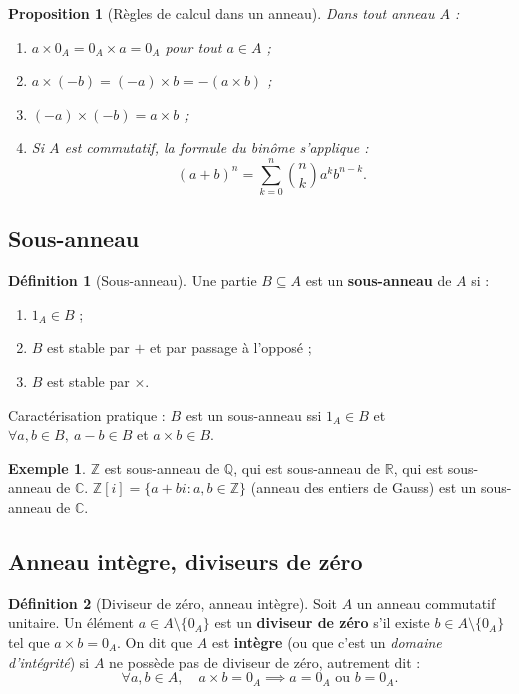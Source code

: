 \documentclass[12pt,a4paper]{report}
\newtheorem{proposition}[theoreme]{Proposition}
\theoremstyle{definition}
\newtheorem{definition}{Définition}[section]
\newtheorem{exemple}{Exemple}[section]
\theoremstyle{remark}
\begin{document}
\begin{proposition}[Règles de calcul dans un anneau]
Dans tout anneau $A$ :
\begin{enumerate}
    \item $a \times 0_A = 0_A \times a = 0_A$ pour tout $a \in A$ ;
    \item $a \times (-b) = (-a) \times b = -(a \times b)$ ;
    \item $(-a) \times (-b) = a \times b$ ;
    \item Si $A$ est commutatif, la formule du binôme s'applique :
    \[ (a + b)^n = \sum_{k=0}^{n} \binom{n}{k} a^k b^{n-k}. \]
\end{enumerate}
\end{proposition}

\subsection{Sous-anneau}

\begin{definition}[Sous-anneau]
Une partie $B \subseteq A$ est un \textbf{sous-anneau} de $A$ si :
\begin{enumerate}
    \item $1_A \in B$ ;
    \item $B$ est stable par $+$ et par passage à l'opposé ;
    \item $B$ est stable par $\times$.
\end{enumerate}
Caractérisation pratique : $B$ est un sous-anneau ssi $1_A \in B$ et $\forall a, b \in B,\ a - b \in B$ et $a \times b \in B$.
\end{definition}

\begin{exemple}
$\mathbb{Z}$ est sous-anneau de $\mathbb{Q}$, qui est sous-anneau de $\mathbb{R}$, qui est sous-anneau de $\mathbb{C}$.
$\mathbb{Z}[i] = \{a + bi : a, b \in \mathbb{Z}\}$ (anneau des entiers de Gauss) est un sous-anneau de $\mathbb{C}$.
\end{exemple}

\subsection{Anneau intègre, diviseurs de zéro}

\begin{definition}[Diviseur de zéro, anneau intègre]
Soit $A$ un anneau commutatif unitaire. Un élément $a \in A \setminus \{0_A\}$ est un \textbf{diviseur de zéro} s'il existe $b \in A \setminus \{0_A\}$ tel que $a \times b = 0_A$.
On dit que $A$ est \textbf{intègre} (ou que c'est un \emph{domaine d'intégrité}) si $A$ ne possède pas de diviseur de zéro, autrement dit :
\[ \forall a, b \in A,\quad a \times b = 0_A \implies a = 0_A \text{ ou } b = 0_A. \]
\end{definition}
\end{document}
